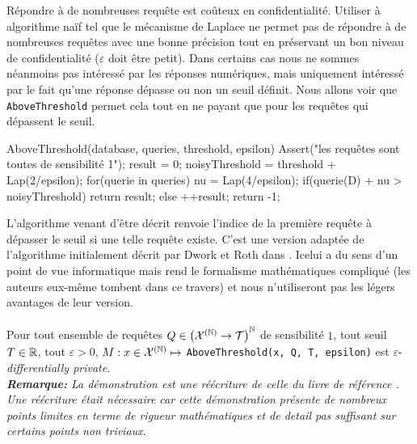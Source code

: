 Répondre à de nombreuses requête est coûteux en confidentialité. Utiliser à algorithme naïf tel que le mécanisme de {\sc Laplace} \cite{10.1007/11681878_14} ne permet pas de répondre à de nombreuses requêtes avec une bonne précision tout en préservant un bon niveau de confidentialité (\(\varepsilon\) doit être petit). Dans certains cas nous ne sommes néanmoins pas intéressé par les réponses numériques, mais uniquement intéressé par le fait qu'une réponse dépasse ou non un seuil définit. Nous allons voir que \texttt{AboveThreshold} \cite{dwork2014the} permet cela tout en ne payant que pour les requêtes qui dépassent le seuil.\\

\label{AboveThreshold}
\begin{code}
    AboveThreshold(database, queries, threshold, epsilon){
        Assert("les requêtes sont toutes de sensibilité 1");
        result = 0;
        noisyThreshold = threshold + Lap(2/epsilon);
        for(querie in queries){
            nu = Lap(4/epsilon);
            if(querie(D) + nu > noisyThreshold)
                return result;
            else
                ++result;
        }
        return -1;
    }
\end{code}

L'algorithme venant d'être décrit renvoie l'indice de la première requête à dépasser le seuil si une telle requête existe. C'est une version adaptée de l'algorithme initialement décrit par {\sc Dwork } et {\sc Roth} dans \cite[page 57]{dwork2014the}. Icelui a du sens d'un point de vue informatique mais rend le formalisme mathématiques compliqué (les auteurs eux-même tombent dans ce travers) et nous n'utiliseront pas les légers avantages de leur version.\\
 
\theoreme{}\\
Pour tout ensemble de requêtes \(Q \in \left( \mathcal X^{(\mathbb{N})} \to  \mathcal T \right)^{\mathbb{N}}\) de sensibilité \(1\), tout seuil \(T \in \mathbb{R}\), tout \(\varepsilon > 0\), \(M : x \in \mathcal X^{(\mathbb{N})} \mapsto \) \texttt{AboveThreshold(x, Q, T, epsilon)} est \(\varepsilon\)-\textit{differentially private}.\\

\textit{\textbf{Remarque:} La démonstration est une réécriture de celle du livre de référence \cite[page57]{dwork2014the}. Une réécriture était nécessaire car cette démonstration présente de nombreux points limites en terme de rigueur mathématiques et de detail pas suffisant sur certains points non triviaux.}\\ 

